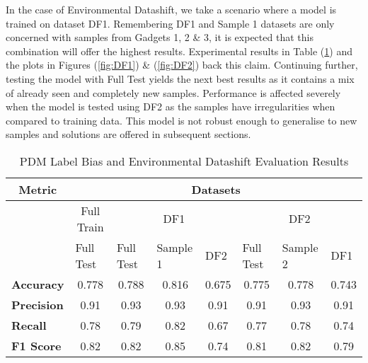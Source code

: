 In the case of Environmental Datashift, we take a scenario where a model is trained on dataset DF1.
Remembering DF1 and Sample 1 datasets are only concerned with samples from Gadgets 1, 2 \& 3, it is expected that this combination will offer the highest results.
Experimental results in Table (\ref{table:Bias}) and the plots in Figures (\ref{fig:DF1}) \& (\ref{fig:DF2}) back this claim. 
Continuing further, testing the model with Full Test yields the next best results as it contains a mix of already seen and completely new samples.   
Performance is affected severely when the model is tested using DF2 as the samples have irregularities when compared to training data.
This model is not robust enough to generalise to new samples and solutions are offered in subsequent sections. 

\bigskip
\begin{table}[H]
    \begin{center}
        \caption{PDM Label Bias and Environmental Datashift Evaluation Results}
        \label{table:Bias}
        \begin{tabular}{lccccccc}
            \toprule
            \multicolumn{1}{c}{\textbf{Metric}} & \multicolumn{7}{c}{\textbf{Datasets}}                                                                                                                                                                                                      \\ \midrule
            \multicolumn{1}{l}{}      & \multicolumn{1}{c|}{Full Train} & \multicolumn{3}{c|}{DF1}                                                                       & \multicolumn{3}{c}{DF2}                                                                       \\ \cline{2-8} 
            \multicolumn{1}{l}{}      & \multicolumn{1}{l|}{Full Test}  & \multicolumn{1}{l|}{Full Test} & \multicolumn{1}{l|}{Sample 1} & \multicolumn{1}{l|}{DF2} & \multicolumn{1}{l|}{Full Test} & \multicolumn{1}{l|}{Sample 2} & \multicolumn{1}{l}{DF1} \\ 
            \midrule
            \textbf{Accuracy}   & 0.778 &0.788  &0.816  &0.675  &0.775      &0.778  &0.743\\
            \textbf{Precision}  &0.91   &0.93   &0.93   &0.91   &0.91       &0.93   &0.91\\
            \textbf{Recall}     &0.78   &0.79   &0.82   &0.67   &0.77       &0.78   &0.74\\
            \textbf{F1 Score}   &0.82   &0.82   &0.85   &0.74   &0.81       &0.82   &0.79\\
        \end{tabular}
    \end{center}
\end{table}

